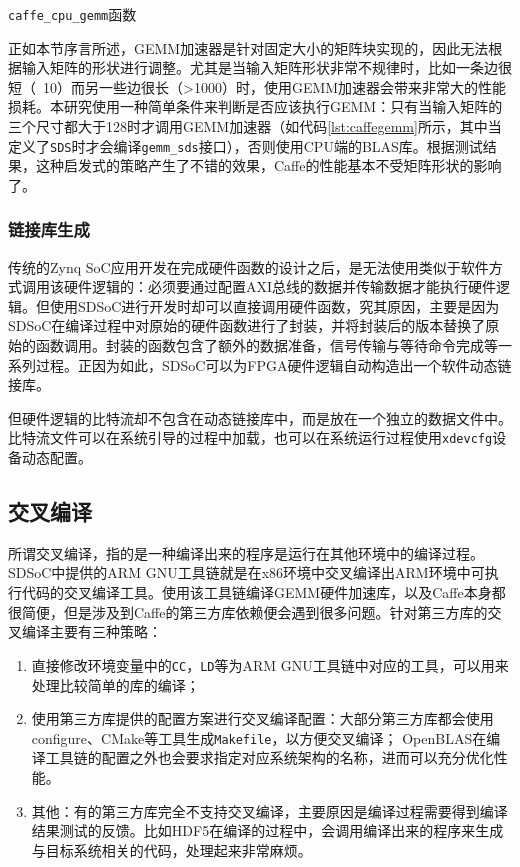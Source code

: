 \begin{listing}[!ht]

\caption{\texttt{caffe\_cpu\_gemm}函数}
\label{lst:caffegemm}
\end{listing}

正如本节序言所述，GEMM加速器是针对固定大小的矩阵块实现的，因此无法根据输入矩阵的形状进行调整。尤其是当输入矩阵形状非常不规律时，比如一条边很短（~10）而另一些边很长（>1000）时，使用GEMM加速器会带来非常大的性能损耗。本研究使用一种简单条件来判断是否应该执行GEMM：只有当输入矩阵的三个尺寸都大于128时才调用GEMM加速器（如代码\ref{lst:caffegemm}所示，其中当定义了\texttt{SDS}时才会编译\texttt{gemm\_sds}接口），否则使用CPU端的BLAS库。根据测试结果，这种启发式的策略产生了不错的效果，Caffe的性能基本不受矩阵形状的影响了。

\subsubsection{链接库生成}

传统的Zynq SoC应用开发在完成硬件函数的设计之后，是无法使用类似于软件方式调用该硬件逻辑的：必须要通过配置AXI总线的数据并传输数据才能执行硬件逻辑。但使用SDSoC进行开发时却可以直接调用硬件函数，究其原因，主要是因为SDSoC在编译过程中对原始的硬件函数进行了封装，并将封装后的版本替换了原始的函数调用。封装的函数包含了额外的数据准备，信号传输与等待命令完成等一系列过程。正因为如此，SDSoC可以为FPGA硬件逻辑自动构造出一个软件动态链接库。

但硬件逻辑的比特流却不包含在动态链接库中，而是放在一个独立的数据文件中。比特流文件可以在系统引导的过程中加载，也可以在系统运行过程使用\texttt{xdevcfg}设备动态配置。

\subsection{交叉编译}

所谓交叉编译，指的是一种编译出来的程序是运行在其他环境中的编译过程。SDSoC中提供的ARM GNU工具链就是在x86环境中交叉编译出ARM环境中可执行代码的交叉编译工具。使用该工具链编译GEMM硬件加速库，以及Caffe本身都很简便，但是涉及到Caffe的第三方库依赖便会遇到很多问题。针对第三方库的交叉编译主要有三种策略：

\begin{enumerate}
\item 直接修改环境变量中的\texttt{CC}，\texttt{LD}等为ARM GNU工具链中对应的工具，可以用来处理比较简单的库的编译；
\item 使用第三方库提供的配置方案进行交叉编译配置：大部分第三方库都会使用configure、CMake等工具生成\texttt{Makefile}，以方便交叉编译； OpenBLAS在编译工具链的配置之外也会要求指定对应系统架构的名称，进而可以充分优化性能。
\item 其他：有的第三方库完全不支持交叉编译，主要原因是编译过程需要得到编译结果测试的反馈。比如HDF5在编译的过程中，会调用编译出来的程序来生成与目标系统相关的代码，处理起来非常麻烦。
\end{enumerate}

